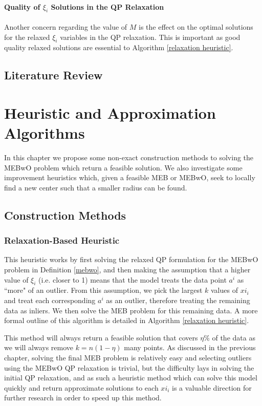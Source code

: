\documentclass[11pt,twoside]{report}
\theoremstyle{definition}
\numberwithin{theorem}{section}
\numberwithin{definition}{section}
\numberwithin{lemma}{section}
\numberwithin{proposition}{section}
\numberwithin{equation}{section}
\numberwithin{figure}{section}
\begin{document}
\subsubsection{Quality of $\xi_i$ Solutions in the QP Relaxation}
Another concern regarding the value of $M$ is the effect on the optimal solutions for the relaxed $\xi_i$ variables in the QP relaxation. This is important as good quality relaxed solutions are essential to Algorithm \ref{relaxation heuristic}.

\section{Literature Review}\label{lit review}


\chapter{Heuristic and Approximation Algorithms}\label{algorithms}

In this chapter we propose some non-exact construction methods to solving the MEBwO problem which return a feasible solution. We also investigate some improvement heuristics which, given a feasible MEB or MEBwO, seek to locally find a new center such that a smaller radius can be found.

\section{Construction Methods}
\subsection{Relaxation-Based Heuristic}
This heuristic works by first solving the relaxed QP formulation for the MEBwO problem in Definition \ref{mebwo}, and then making the assumption that a higher value of $\xi_i$ (i.e. closer to 1) means that the model treats the data point $a^i$ as ``more" of an outlier. From this assumption, we pick the largest $k$ values of $xi_i$ and treat each corresponding $a^i$ as an outlier, therefore treating the remaining data as inliers. We then solve the MEB problem for this remaining data. A more formal outline of this algorithm is detailed in Algorithm \ref{relaxation heuristic}.

This method will always return a feasible solution that covers $\eta\%$ of the data as we will always remove $k=n(1-\eta)$ many points. As discussed in the previous chapter, solving the final MEB problem is relatively easy and selecting outliers using the MEBwO QP relaxation is trivial, but the difficulty lays in solving the initial QP relaxation, and as such a heuristic method which can solve this model quickly and return approximate solutions to each $xi_i$ is a valuable direction for further research in order to speed up this method.
\end{document}
